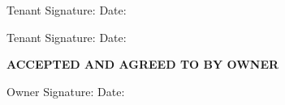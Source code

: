 \documentclass[8pt, letterpaper, oneside]{extarticle}
\begin{document}
 Tenant Signature: \hspace{5mm} \underline{\hspace{90mm}} \hspace{10mm} Date: \hspace{5mm} \underline{\hspace{40mm}}

 \vspace{10mm}

 Tenant Signature: \hspace{5mm} \underline{\hspace{90mm}} \hspace{10mm} Date: \hspace{5mm} \underline{\hspace{40mm}}

 \vspace{10mm}

 \textbf{ACCEPTED AND AGREED TO BY OWNER}

 \vspace{10mm} 
 Owner Signature: \hspace{5mm} \underline{\hspace{90mm}} \hspace{10mm} Date: \hspace{5mm} \underline{\hspace{40mm}}

 
\end{document}
